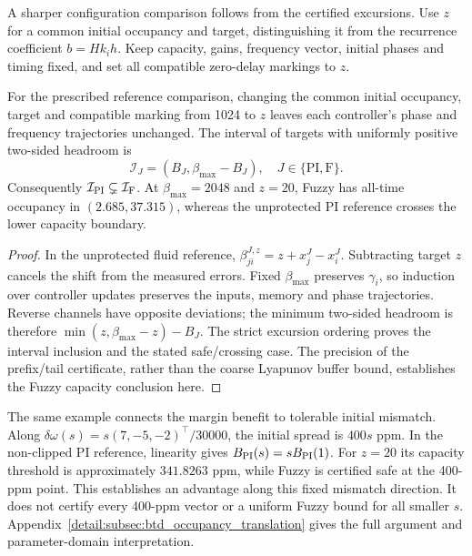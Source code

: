 A sharper configuration comparison follows from the certified
excursions. Use $z$ for a common initial occupancy and target,
distinguishing it from the recurrence coefficient $b=Hk_ih$.
Keep capacity, gains, frequency vector, initial phases and timing
fixed, and set all compatible zero-delay markings to $z$.

\begin{btdcorollary}
\label{cor:btd_occupancy_advantage}
For the prescribed reference comparison, changing the common initial
occupancy, target and compatible marking from 1024 to $z$ leaves
each controller's phase and frequency trajectories unchanged.
The interval of targets with uniformly positive two-sided headroom is
\begin{equation}
 \mathcal I_J=(B_J,\beta_{\max}-B_J),\quad J\in\{\mathrm{PI},\mathrm F\}.
 \label{eq:btd_target_interval}
\end{equation}
Consequently $\mathcal I_{\rm PI}\subsetneq\mathcal I_{\rm F}$.
At $\beta_{\max}=2048$ and $z=20$, Fuzzy has all-time occupancy in
$(2.685,37.315)$, whereas the unprotected PI reference crosses
the lower capacity boundary.
\end{btdcorollary}
\begin{proof}
In the unprotected fluid reference,
$\beta_{ji}^{J,z}=z+x_j^J-x_i^J$.
Subtracting target $z$ cancels the shift from the measured errors.
Fixed $\beta_{\max}$ preserves $\gamma_i$, so induction over controller updates
preserves the inputs, memory and phase trajectories. Reverse channels
have opposite deviations; the minimum two-sided headroom is therefore
$\min(z,\beta_{\max}-z)-B_J$. The strict excursion ordering proves the interval
inclusion and the stated safe/crossing case. The precision of the
prefix/tail certificate, rather than the coarse Lyapunov buffer
bound, establishes the Fuzzy capacity conclusion here.
\end{proof}

The same example connects the margin benefit to tolerable initial
mismatch. Along $\delta\omega(s)=s(7,-5,-2)^\top/30000$, the
initial spread is $400s$ ppm. In the non-clipped PI reference,
linearity gives $B_{\rm PI}(s)=sB_{\rm PI}(1)$. For $z=20$ its
capacity threshold is approximately $341.8263$ ppm, while Fuzzy
is certified safe at the 400-ppm point. This establishes an advantage
along this fixed mismatch direction. It does not certify every
400-ppm vector or a uniform Fuzzy bound for all smaller $s$.
Appendix~\ref{detail:subsec:btd_occupancy_translation} gives the full
argument and parameter-domain interpretation.

